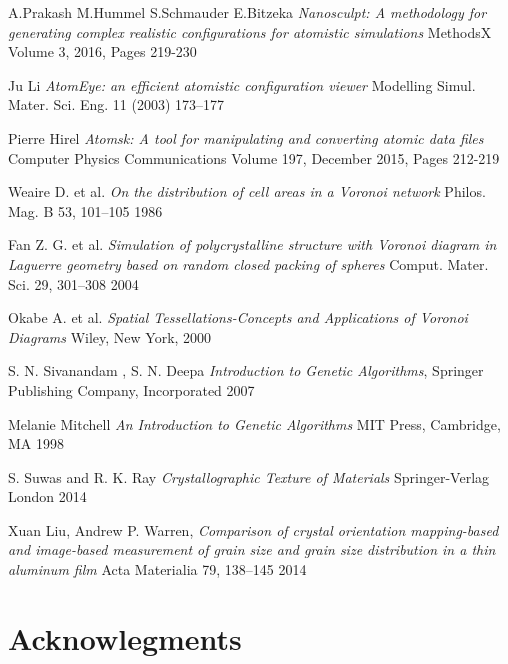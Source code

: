 \documentclass{article}
\begin{document}
\begin{thebibliography}{9}
  A.Prakash M.Hummel S.Schmauder E.Bitzeka
  \textit{Nanosculpt: A methodology for generating complex realistic configurations for atomistic simulations}
 MethodsX
Volume 3, 2016, Pages 219-230

  Ju Li
  \textit{AtomEye: an efficient atomistic configuration viewer}
 Modelling Simul. Mater. Sci. Eng. 11 (2003) 173–177

  Pierre Hirel
  \textit{Atomsk: A tool for manipulating and converting atomic data files}
 Computer Physics Communications
Volume 197, December 2015, Pages 212-219

  Weaire D. et al. 
  \textit{On the distribution of cell areas in a Voronoi network}
  Philos. Mag. B 53, 101–105 
  1986

  Fan Z. G. et al. 
  \textit{Simulation of polycrystalline structure with Voronoi diagram in Laguerre geometry    based on random closed packing of spheres} 
  Comput. Mater. Sci. 29, 301–308 
  2004

Okabe A. et al. 
\textit{Spatial Tessellations-Concepts and Applications of Voronoi Diagrams}
Wiley, New York, 
2000

  S. N. Sivanandam , S. N. Deepa
  \textit{Introduction to Genetic Algorithms},
  Springer Publishing Company, Incorporated
  2007

  Melanie Mitchell
  \textit{An Introduction to Genetic Algorithms}
  MIT Press, Cambridge, MA
 1998

  S. Suwas and R. K. Ray
  \textit{Crystallographic Texture of Materials}
  Springer-Verlag London 
  2014

  Xuan Liu, Andrew P. Warren,
  \textit{Comparison of crystal orientation mapping-based and image-based measurement of grain size and grain size distribution in a thin aluminum film}
  Acta Materialia 79, 138–145
  2014

\end{thebibliography}


\section{Acknowlegments}
\end{document}
